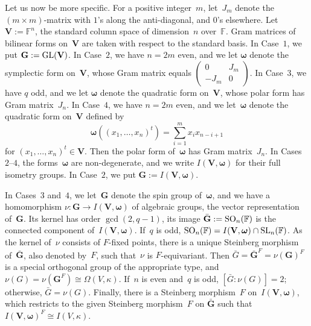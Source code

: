 \documentclass[12pt]{amsart}
\newcommand{\bG}{{\mathbf{G}}}      %
\newcommand{\bV}{{\mathbf{V}}}
\def\GL{ \text{\rm GL} }
\def\SO{ \text{\rm SO} }
\def\SL{ \text{\rm SL} }
\def\SO{ \text{\rm SO} }
\theoremstyle{theorem}
\theoremstyle{definition}
\theoremstyle{remark}
\begin{document}
Let us now be more specific. For a positive integer~$m$, let~$J_m$ denote the 
$(m \times m)$-matrix with $1$'s along the anti-diagonal, and $0$'s elsewhere.
Let $\bV := \mathbb{F}^n$, the standard column space of dimension~$n$ 
over~$\mathbb{F}$. Gram matrices of bilinear forms on~$\bV$ are taken with 
respect to the standard basis. In Case~$1$, we put $\bG := \GL( \bV )$. In 
Case~$2$, we have $n = 2m$ even, and we let $\boldsymbol{\omega}$ denote the 
symplectic form on~$\bV$, whose Gram matrix equals 
$\left( \begin{array}{cc} 0 & J_m \\ -J_m & 0 \end{array} \right)$. In Case~$3$, 
we have $q$ odd, and we let $\boldsymbol{\omega}$ denote the quadratic form 
on~$\bV$, whose polar form has Gram matrix~$J_n$. In Case~$4$, we have $n = 2m$ 
even, and we let~$\boldsymbol{\omega}$ denote the quadratic form on~$\bV$ 
defined by
$$\boldsymbol{\omega}( (x_1, \ldots , x_n)^t ) = \sum_{i = 1}^m x_i x_{n-i+1}$$
for $(x_1, \ldots , x_n)^t \in \bV$. Then the polar form of~$\boldsymbol{\omega}$
has Gram matrix~$J_n$. In Cases~$2$--$4$, the forms~$\boldsymbol{\omega}$ are 
non-degenerate, and we write $I( \bV, \boldsymbol{\omega} )$ for their full 
isometry groups. In Case~$2$, we put $\bG := I( \bV, \boldsymbol{\omega} )$.

In Cases~$3$ and~$4$, we let~$\bG$ denote the spin group 
of~$\boldsymbol{\omega}$, and we have a homomorphism 
$\nu : \mathbf{G} \rightarrow I( \bV, \boldsymbol{\omega} )$ of algebraic 
groups, the vector representation of~$\mathbf{G}$. Its kernel has order 
$\gcd( 2, q - 1)$, its image $\bar{\mathbf{G}} := \SO_n( \mathbb{F} )$ is the 
connected component of~$I( \bV, \boldsymbol{\omega} )$. If~$q$ is odd, 
$\SO_n( \mathbb{F} ) = I( \bV, \boldsymbol{\omega} ) \cap \SL_n( \mathbb{F} )$. 
As the kernel of~$\nu$ consists of $F$-fixed points, there is a unique Steinberg 
morphism of~$\bar{\mathbf{G}}$, also denoted by~$F$, such that~$\nu$ is 
$F$-equivariant. Then $\bar{G} = \bar{\mathbf{G}}^F = \nu( \mathbf{G} )^F$ is a
special orthogonal group of the appropriate type, 
and $\nu( G ) = \nu( \mathbf{G}^F ) \cong \Omega(V, \kappa )$.
If~$n$ is even and~$q$ is odd, $[\bar{G}\colon\!\nu(G)] = 2$; 
otherwise, $\bar{G} = \nu(G)$. Finally, there is a Steinberg 
morphism~$F$ on~$I( \bV, \boldsymbol{\omega} )$, which restricts to the given 
Steinberg morphism~$F$ on $\bar{\bG}$ such that 
$I( \bV, \boldsymbol{\omega} )^F \cong I( V, \kappa )$.
\end{document}
